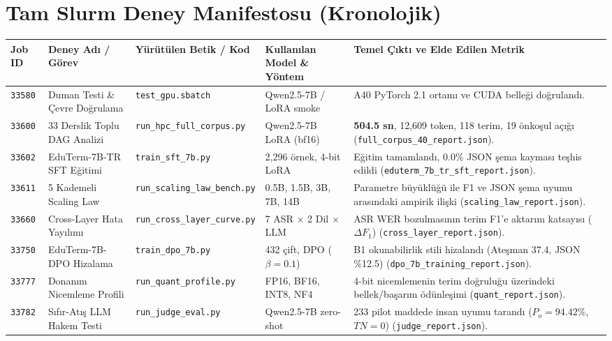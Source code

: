 \documentclass[10pt,a4paper]{article}
\begin{document}
\vspace{0.2cm}

\section{Tam Slurm Deney Manifestosu (Kronolojik)}

\scriptsize
\setlength{\tabcolsep}{3pt}
\begin{tabularx}{\textwidth}{lp{2.8cm}p{3.4cm}p{3.2cm}X}
\toprule
\textbf{Job ID} & \textbf{Deney Adı / Görev} & \textbf{Yürütülen Betik / Kod} & \textbf{Kullanılan Model \& Yöntem} & \textbf{Temel Çıktı ve Elde Edilen Metrik} \\
\midrule
\texttt{33580} & Duman Testi \& Çevre Doğrulama & \texttt{test\_gpu.sbatch} & Qwen2.5-7B / LoRA smoke & A40 PyTorch 2.1 ortamı ve CUDA belleği doğrulandı. \\
\addlinespace
\texttt{33600} & 33 Derslik Toplu DAG Analizi & \texttt{run\_hpc\_full\_corpus.py} & Qwen2.5-7B LoRA (bf16) & \textbf{504.5 sn}, 12,609 token, 118 terim, 19 önkoşul açığı (\texttt{full\_corpus\_40\_report.json}). \\
\addlinespace
\texttt{33602} & EduTerm-7B-TR SFT Eğitimi & \texttt{train\_sft\_7b.py} & 2,296 örnek, 4-bit LoRA & Eğitim tamamlandı, 0.0\% JSON şema kayması teşhis edildi (\texttt{eduterm\_7b\_tr\_sft\_report.json}). \\
\addlinespace
\texttt{33611} & 5 Kademeli Scaling Law & \texttt{run\_scaling\_law\_bench.py} & 0.5B, 1.5B, 3B, 7B, 14B & Parametre büyüklüğü ile F1 ve JSON şema uyumu arasındaki ampirik ilişki (\texttt{scaling\_law\_report.json}). \\
\addlinespace
\texttt{33660} & Cross-Layer Hata Yayılımı & \texttt{run\_cross\_layer\_curve.py} & 7 ASR $\times$ 2 Dil $\times$ LLM & ASR WER bozulmasının terim F1'e aktarım katsayısı ($\Delta F_1$) (\texttt{cross\_layer\_report.json}). \\
\addlinespace
\texttt{33750} & EduTerm-7B-DPO Hizalama & \texttt{train\_dpo\_7b.py} & 432 çift, DPO ($\beta=0.1$) & B1 okunabilirlik stili hizalandı (Ateşman 37.4, JSON \%12.5) (\texttt{dpo\_7b\_training\_report.json}). \\
\addlinespace
\texttt{33777} & Donanım Nicemleme Profili & \texttt{run\_quant\_profile.py} & FP16, BF16, INT8, NF4 & 4-bit nicemlemenin terim doğruluğu üzerindeki bellek/başarım ödünleşimi (\texttt{quant\_report.json}). \\
\addlinespace
\texttt{33782} & Sıfır-Atış LLM Hakem Testi & \texttt{run\_judge\_eval.py} & Qwen2.5-7B zero-shot & 233 pilot maddede insan uyumu tarandı ($P_o=94.42\%$, $TN=0$) (\texttt{judge\_report.json}). \\

\end{tabularx}
\end{document}
